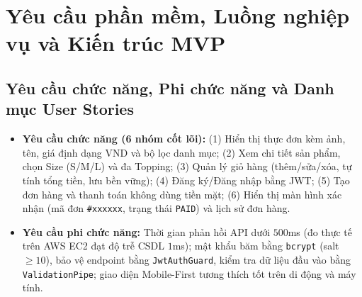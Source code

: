 \documentclass[a4paper,12pt]{article}
\begin{document}
\newpage
\section{Yêu cầu phần mềm, Luồng nghiệp vụ và Kiến trúc MVP}

\subsection{Yêu cầu chức năng, Phi chức năng và Danh mục User Stories}
\begin{itemize}
  \item \textbf{Yêu cầu chức năng (6 nhóm cốt lõi):} (1) Hiển thị thực đơn kèm ảnh, tên, giá định dạng VND và bộ lọc danh mục; (2) Xem chi tiết sản phẩm, chọn Size (S/M/L) và đa Topping; (3) Quản lý giỏ hàng (thêm/sửa/xóa, tự tính tổng tiền, lưu bền vững); (4) Đăng ký/Đăng nhập bằng JWT; (5) Tạo đơn hàng và thanh toán không dùng tiền mặt; (6) Hiển thị màn hình xác nhận (mã đơn \texttt{\#xxxxxx}, trạng thái \texttt{PAID}) và lịch sử đơn hàng.
  \item \textbf{Yêu cầu phi chức năng:} Thời gian phản hồi API dưới $500$ms (đo thực tế trên AWS EC2 đạt độ trễ CSDL $1$ms); mật khẩu băm bằng \texttt{bcrypt} (salt $\ge 10$), bảo vệ endpoint bằng \texttt{JwtAuthGuard}, kiểm tra dữ liệu đầu vào bằng \texttt{ValidationPipe}; giao diện Mobile-First tương thích tốt trên di động và máy tính.
\end{itemize}
\end{document}
